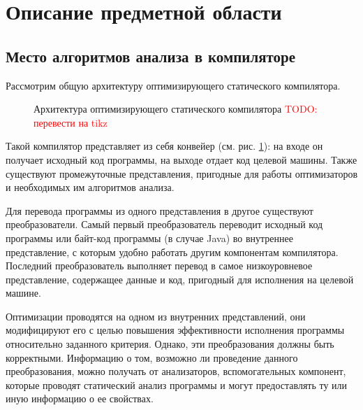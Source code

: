 \documentclass[14pt,titlepage]{extarticle}
\newcommand{\todo}[1]{\textcolor{red}{\eng{TODO}: #1}}
\newcommand{\eng}[1]{{\English#1}}
\let\oldsection\section
\renewcommand{\section}{\newpage\oldsection}
\begin{document}
  \section{Описание предметной области}

    \subsection{Место алгоритмов анализа в компиляторе}

      Рассмотрим общую архитектуру оптимизирующего статического компилятора.

      \begin{figure}[!htb]
        \caption{Архитектура оптимизирующего статического компилятора
                 \todo{перевести на tikz}}
        \label{fig:arch}
      \end{figure}

      Такой компилятор представляет из себя конвейер (см. рис. \ref{fig:arch}):
      на входе он получает исходный код программы, на выходе отдает код целевой
      машины.
      Также существуют промежуточные представления, пригодные для работы
      оптимизаторов и необходимых им алгоритмов анализа.

      Для перевода программы из одного представления в другое существуют
      преобразователи.
      Самый первый преобразователь переводит исходный код программы
      или байт-код программы (в случае Java)
      во внутреннее представление, с которым удобно работать другим
      компонентам компилятора.
      Последний преобразователь выполняет перевод в самое низкоуровневое
      представление, содержащее данные и код, пригодный для исполнения
      на целевой машине.

      Оптимизации проводятся на одном из внутренних представлений, они
      модифицируют его с целью повышения эффективности исполнения программы
      относительно заданного критерия. Однако, эти преобразования должны быть
      корректными. Информацию о том, возможно ли проведение данного
      преобразования, можно получать от анализаторов, вспомогательных
      компонент, которые проводят статический анализ программы и могут
      предоставлять ту или иную информацию о ее свойствах.
\end{document}
